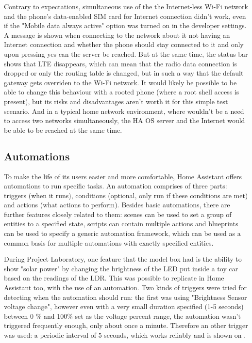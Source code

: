 Contrary to expectations, simultaneous use of the the Internet-less Wi-Fi network and the phone's data-enabled SIM card for Internet connection didn't work, even if the "Mobile data always active" option was turned on in the developer settings. A message is shown when connecting to the network about it not having an Internet connection and whether the phone should stay connected to it and only upon pressing yes can the server be reached. But at the same time, the status bar shows that LTE disappears, which can mean that the radio data connection is dropped or only the routing table is changed, but in such a way that the default gateway gets overriden to the Wi-Fi network. It would likely be possible to be able to change this behaviour with a rooted phone (where a root shell access is present), but its risks and disadvantages aren't worth it for this simple test scenario. And in a typical home network environment, where wouldn't be a need to access two networks simultaneously, the HA OS server and the Internet would be able to be reached at the same time.

\subsection{Automations}

To make the life of its users easier and more comfortable, Home Assistant offers automations to run specific tasks. An automation comprises of three parts: triggers (when it runs), conditions (optional, only run if these conditions are met) and actions (what actions to perform). \cite{HAAutomationBasics} Besides basic automations, there are further features closely related to them: scenes can be used to set a group of entities to a specified state, scripts can contain multiple actions and blueprints can be used to specify a generic automation framework, which can be used as a common basis for multiple automations with exactly specified entities.

During Project Laboratory, one feature that the model box had is the ability to show "solar power" by changing the brightness of the LED put inside a toy car based on the readings of the LDR. This was possible to replicate in Home Assistant too, with the use of an automation. Two kinds of triggers were tried for detecting when the automation should run: the first was using "Brightness Sensor voltage change", however even with a very small duration specified (1-5 seconds) between 0 \% and 100\% set as the voltage percent range, the automation wasn't triggered frequently enough, only about once a minute. Therefore an other trigger was used: a periodic interval of 5 seconds, which works reliably and is shown on .

